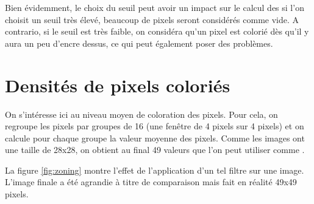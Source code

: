 Bien évidemment, le choix du seuil peut avoir un impact sur le calcul des 
\features si l'on choisit un seuil très élevé, beaucoup de pixels seront 
considérés comme vide. A contrario, si le seuil est très faible, on considéra 
qu'un pixel est colorié dès qu'il y aura un peu d'encre dessus, ce qui peut 
également poser des problèmes.



\section{Densités de pixels coloriés}

On s'intéresse ici au niveau moyen de coloration des pixels. 
Pour cela, on regroupe les pixels par groupes de 16 (une fenêtre 
de 4 pixels sur 4 pixels) et on calcule pour chaque groupe la 
valeur moyenne des pixels.
Comme les images ont une taille de 28x28, on obtient au final 
49 valeurs que l'on peut utiliser comme .

La figure \ref{fig:zoning} montre l'effet de l'application 
d'un tel filtre sur une image. 
L'image finale a été agrandie à titre de comparaison mais 
fait en réalité 49x49 pixels.

